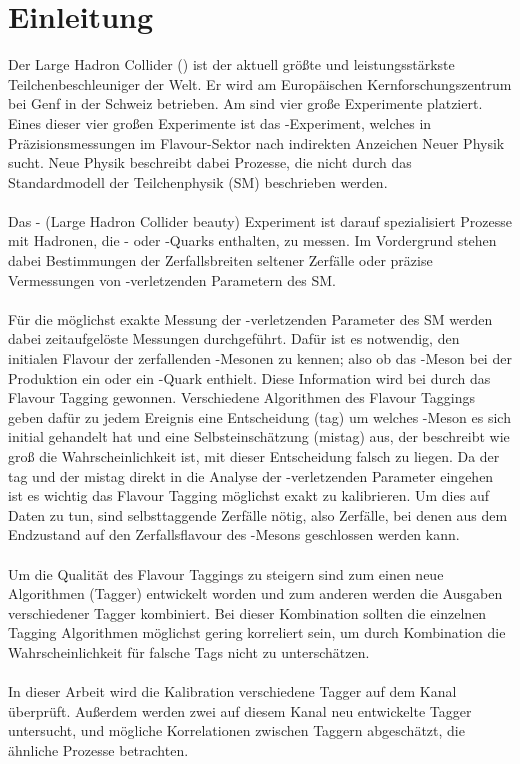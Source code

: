 \chapter{Einleitung}

Der Large Hadron Collider (\lhc) ist der aktuell größte und leistungsstärkste Teilchenbeschleuniger der Welt. Er wird am Europäischen Kernforschungszentrum \cern bei Genf in der Schweiz betrieben. Am \lhc sind vier große Experimente platziert. Eines dieser vier großen Experimente ist das \lhcb-Experiment, welches in Präzisionsmessungen im Flavour-Sektor nach indirekten Anzeichen Neuer Physik sucht. Neue Physik beschreibt dabei Prozesse, die nicht durch das Standardmodell der Teilchenphysik (SM) beschrieben werden.\\
\\
Das \lhcb- (Large Hadron Collider beauty) Experiment ist darauf spezialisiert Prozesse mit Hadronen, die \bquark- oder \cquark-Quarks enthalten, zu messen. Im Vordergrund stehen dabei Bestimmungen der Zerfallsbreiten seltener Zerfälle oder präzise Vermessungen von \CP-verletzenden Parametern des SM.\\
\\
Für die möglichst exakte Messung der \CP-verletzenden Parameter des SM werden dabei zeitaufgelöste Messungen durchgeführt. Dafür ist es notwendig, den initialen Flavour der zerfallenden \B-Mesonen zu kennen; also ob das \B-Meson bei der Produktion ein \bquark oder ein \bquarkbar-Quark enthielt. Diese Information wird bei \lhcb durch das Flavour Tagging gewonnen. Verschiedene Algorithmen des Flavour Taggings geben dafür zu jedem Ereignis eine Entscheidung (tag) um welches \B-Meson es sich initial gehandelt hat und eine Selbsteinschätzung (mistag) aus, der beschreibt wie groß die Wahrscheinlichkeit ist, mit dieser Entscheidung falsch zu liegen. Da der tag und der mistag direkt in die Analyse der \CP-verletzenden Parameter eingehen ist es wichtig das Flavour Tagging möglichst exakt zu kalibrieren. Um dies auf Daten zu tun, sind selbsttaggende Zerfälle nötig, also Zerfälle, bei denen aus dem Endzustand auf den Zerfallsflavour des \B-Mesons geschlossen werden kann. \\
\\
Um die Qualität des Flavour Taggings zu steigern sind zum einen neue Algorithmen (Tagger) entwickelt worden \cite{charm-tagger} und zum anderen werden die Ausgaben verschiedener Tagger kombiniert. Bei dieser Kombination sollten die einzelnen Tagging Algorithmen möglichst gering korreliert sein, um durch Kombination die Wahrscheinlichkeit für falsche Tags nicht zu unterschätzen.\\
\\
In dieser Arbeit wird die Kalibration verschiedene Tagger auf dem Kanal \mbox{\BdToDpi} überprüft. Außerdem werden zwei auf diesem Kanal neu entwickelte Tagger untersucht, und mögliche Korrelationen zwischen Taggern abgeschätzt, die ähnliche Prozesse betrachten. 
